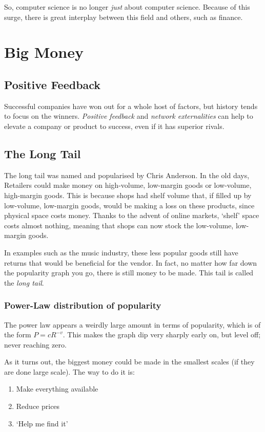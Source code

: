 \documentclass[11pt,a4paper,titlepage,dvipsnames,cmyk]{scrartcl}
\begin{document}
So, computer science is no longer \textit{just} about computer science. Because of this surge, there is great interplay between this field and others, such as finance.

\section{Big Money}
\subsection{Positive Feedback}
Successful companies have won out for a whole host of factors, but history tends to focus on the winners. \textit{Positive feedback} and \textit{network externalities} can help to elevate a company or product to success, even if it has superior rivals.

\subsection{The Long Tail}
The long tail was named and popularised by Chris Anderson. In the old days, Retailers could make money on high-volume, low-margin goods or low-volume, high-margin goods. This is because shops had shelf volume that, if filled up by low-volume, low-margin goods, would be making a loss on these products, since physical space costs money. Thanks to the advent of online markets, `shelf' space costs almost nothing, meaning that shops can now stock the low-volume, low-margin goods.

In examples such as the music industry, these less popular goods still have returns that would be beneficial for the vendor. In fact, no matter how far down the popularity graph you go, there is still money to be made. This tail is called the \textit{long tail}.

\subsubsection{Power-Law distribution of popularity}
The power law appears a weirdly large amount in terms of popularity, which is of the form $P = cR^{-v}$. This makes the graph dip very sharply early on, but level off; never reaching zero.

As it turns out, the biggest money could be made in the smallest scales (if they are done large scale). The way to do it is:
\begin{enumerate}
\item Make everything available
\item Reduce prices
\item `Help me find it'
\end{enumerate}
\end{document}
